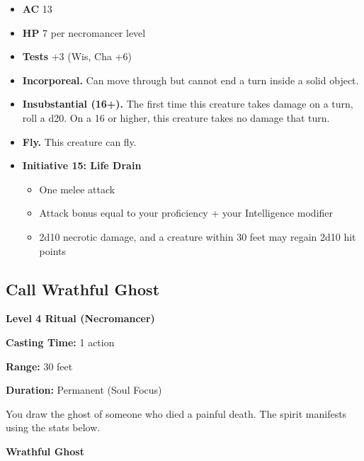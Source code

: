 \documentclass[12pt,letterpaper,twocolumn,openany,nodeprecatedcode,bg=none]{dndbook}
\providecommand{\tightlist}{%
  \setlength{\itemsep}{0pt}\setlength{\parskip}{0pt}}
\begin{document}
\begin{itemize}
\tightlist
\item
  \textbf{AC} 13
\item
  \textbf{HP} 7 per necromancer level
\item
  \textbf{Tests} +3 (Wis, Cha +6)
\item
  \textbf{Incorporeal.} Can move through but cannot end a turn inside a
  solid object.
\item
  \textbf{Insubstantial (16+).} The first time this creature takes
  damage on a turn, roll a d20. On a 16 or higher, this creature takes
  no damage that turn.
\item
  \textbf{Fly.} This creature can fly.
\item
  \textbf{Initiative 15: Life Drain}

  \begin{itemize}
  \tightlist
  \item
    One melee attack
  \item
    Attack bonus equal to your proficiency + your Intelligence modifier
  \item
    2d10 necrotic damage, and a creature within 30 feet may regain 2d10
    hit points
  \end{itemize}
\end{itemize}

\subsection{Call Wrathful Ghost}\label{call-wrathful-ghost}

\textbf{Level 4 Ritual (Necromancer)}

\textbf{Casting Time:} 1 action

\textbf{Range:} 30 feet

\textbf{Duration:} Permanent (Soul Focus)

You draw the ghost of someone who died a painful death. The spirit
manifests using the stats below.

\textbf{Wrathful Ghost}
\end{document}
